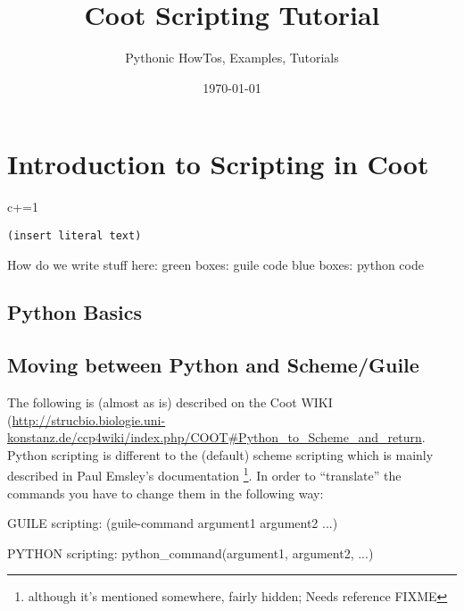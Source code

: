 \documentclass{article}
\title{Coot Scripting Tutorial}
\author{Pythonic HowTos, Examples, Tutorials}
\date{\today}
\begin{document}
\maketitle
\tableofcontents


\newpage

\section{Introduction to Scripting in Coot}

\begin{code}
  c+=1
\end{code}

\begin{verbatim}
(insert literal text)
\end{verbatim}

How do we write stuff here:
green boxes: guile code
blue boxes:  python code

\subsection{Python Basics}

\subsection{Moving between Python and Scheme/Guile}
The following is (almost as is) described on the Coot WIKI (\url{http://strucbio.biologie.uni-konstanz.de/ccp4wiki/index.php/COOT#Python_to_Scheme_and_return}.
Python scripting is different to the (default) scheme scripting which is mainly described in Paul Emsley's documentation \footnote{although it's mentioned somewhere, fairly hidden; Needs reference FIXME}. In order to ``translate'' the commands you have to change them in the following way:

 GUILE scripting: (guile-command argument1 argument2 ...)

 PYTHON scripting: python\_command(argument1, argument2, ...)
\end{document}
